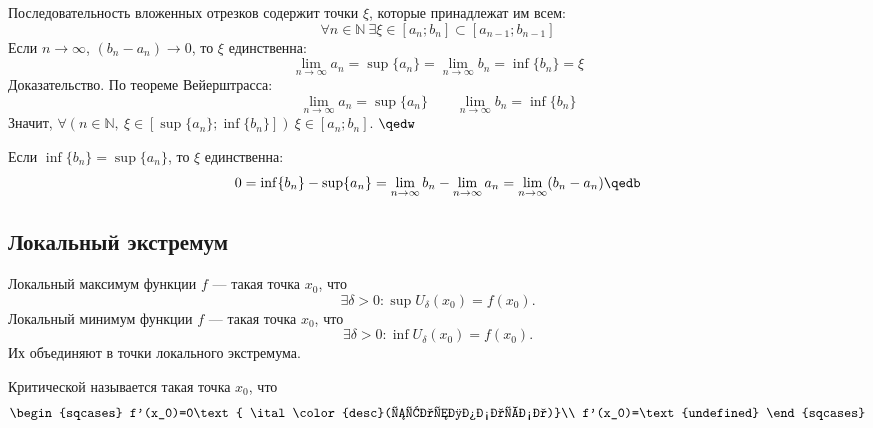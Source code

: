 Последовательность вложенных отрезков содержит точки $\xi$, которые принадлежат им всем:
$$\forall n\in\mathbb{N}\ \exists\xi\in[a_n;b_n]\subset[a_{n-1};b_{n-1}]$$
Если $n\to\infty$, $(b_n-a_n)\to 0$, то $\xi$ единственна:
$$\lim_{n\to\infty}a_n=\sup\{a_n\}=\lim_{n\to\infty}b_n=\inf\{b_n\}=\xi$$
{\bold Доказательство.} По теореме Вейерштрасса:
$$\lim_{n\to\infty}a_n=\sup\{a_n\}\quad\quad\lim_{n\to\infty}b_n=\inf\{b_n\}$$
Значит, $\forall(n\in\mathbb{N},\ \xi\in[\sup\{a_n\};\inf\{b_n\}])\ \xi\in[a_n;b_n]$.
$\qedw$

Если $\inf\{b_n\}=\sup\{a_n\}$, то $\xi$ единственна:
$$0=\inf\{b_n\}-\sup\{a_n\}=\lim_{n\to\infty}b_n-\lim_{n\to\infty}a_n=\lim_{n\to\infty}
(b_n-a_n)\qedb$$

\subsection{Локальный экстремум}

{\ital Локальный} {\bold максимум} функции $f$ --- такая точка $x_0$, что
$$\exists\delta\greater 0\colon\sup U_\delta(x_0)=f(x_0).$$ 
{\ital Локальный} {\bold минимум} функции $f$ --- такая точка $x_0$, что
$$\exists\delta\greater 0\colon\inf U_\delta(x_0)=f(x_0).$$
 Их объединяют в точки {\ital локального} {\bold экстремума}.
 
{\ital Критической} называется такая точка $x_0$, что
$$\begin{sqcases}
f'(x_0)=0\text{ \ital\color{desc}(стационарна)}\\
f'(x_0)=\text{undefined}
\end{sqcases}$$
